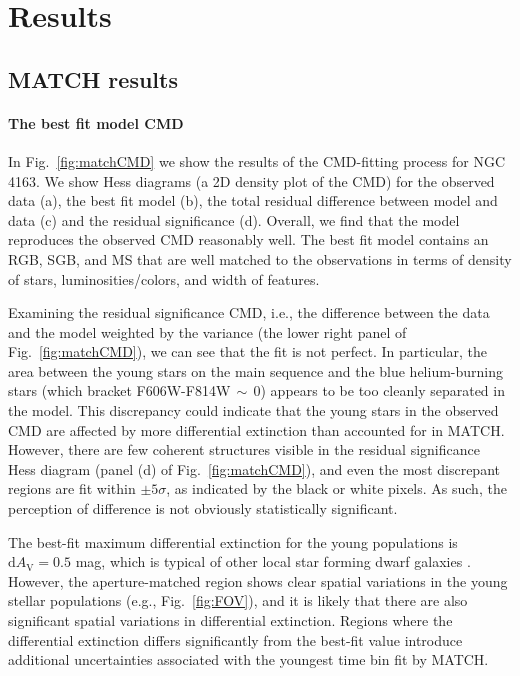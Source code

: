 \documentclass[preprint2]{aastex62}
\newcommand{\dAv}{\ensuremath{\mathrm{d}A_{\mathrm{V}}}\xspace}
\begin{document}
\section{Results}\label{sec:results}

\subsection{MATCH results}\label{sec:results:match}
\paragraph{The best fit model CMD}
In Fig.~\ref{fig:matchCMD} we show the results of the CMD-fitting process for NGC 4163. We show Hess diagrams (a 2D density plot of the CMD) for the observed data (a), the best fit model (b), the total residual difference between model and data (c) and the residual significance (d). Overall, we find that the model reproduces the observed CMD reasonably well. The best fit model contains an RGB, SGB, and MS that are well matched to the observations in terms of density of stars, luminosities/colors, and width of features.

Examining the residual significance CMD, i.e., the difference between the data and the model weighted by the variance (the lower right panel of Fig.~\ref{fig:matchCMD}), we can see that the fit is not perfect. In particular, the area between the young stars on the main sequence and the blue helium-burning stars (which bracket F606W-F814W$\,{\sim}\,0$) appears to be too cleanly separated in the model. This discrepancy could indicate that the young stars in the observed CMD are affected by more differential extinction than accounted for in MATCH. However, there are few coherent structures visible in the residual significance Hess diagram (panel (d) of Fig.~\ref{fig:matchCMD}), and even the most discrepant regions are fit within $\pm 5\sigma$, as indicated by the black or white pixels. As such, the perception of difference is not obviously statistically significant.

The best-fit maximum differential extinction for the young populations is $\dAv = 0.5$ mag, which is typical of other local star forming dwarf galaxies \citep{Weisz+2011}. However, the aperture-matched region shows clear spatial variations in the young stellar populations (e.g., Fig.~\ref{fig:FOV}), and it is likely that there are also significant spatial variations in differential extinction. Regions where the differential extinction differs significantly from the best-fit value introduce additional uncertainties associated with the youngest time bin fit by MATCH. %
\end{document}
